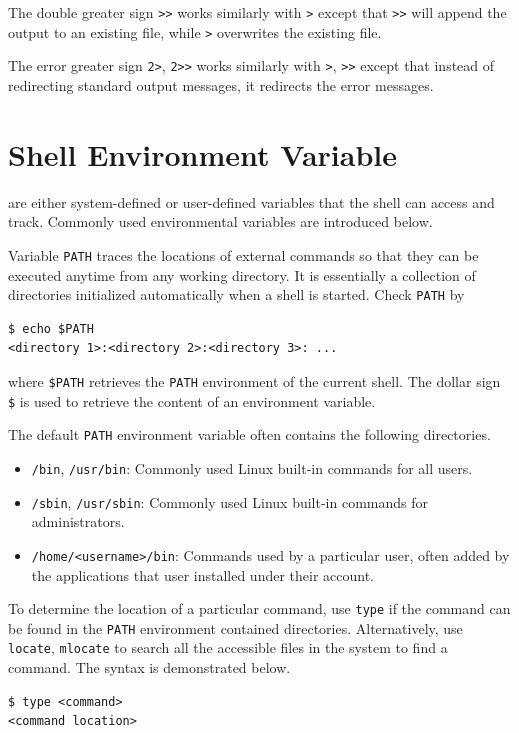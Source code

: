 The double greater sign \verb|>>| works similarly with \verb|>| except that \verb|>>| will append the output to an existing file, while \verb|>| overwrites the existing file.

The error greater sign \verb|2>|, \verb|2>>| works similarly with \verb|>|, \verb|>>| except that instead of redirecting standard output messages, it redirects the error messages.

\section{Shell Environment Variable}\label{ch:sb:subsec:shellenvvar}

 are either system-defined or user-defined variables that the shell can access and track. Commonly used environmental variables are introduced below.

Variable \verb|PATH| traces the locations of external commands so that they can be executed anytime from any working directory. It is essentially a collection of directories initialized automatically when a shell is started. Check \verb|PATH| by
\begin{lstlisting}
$ echo $PATH
<directory 1>:<directory 2>:<directory 3>: ...
\end{lstlisting}
where \verb|$PATH| retrieves the \verb|PATH| environment of the current shell. The dollar sign \verb|$| is used to retrieve the content of an environment variable. 

The default \verb|PATH| environment variable often contains the following directories. 
\begin{itemize}
\item \verb|/bin|, \verb|/usr/bin|: Commonly used Linux built-in commands for all users.
\item \verb|/sbin|, \verb|/usr/sbin|: Commonly used Linux built-in commands for administrators.
\item \verb|/home/<username>/bin|: Commands used by a particular user, often added by the applications that user installed under their account.
\end{itemize}
To determine the location of a particular command, use \verb|type| if the command can be found in the \verb|PATH| environment contained directories. Alternatively, use \verb|locate|, \verb|mlocate| to search all the accessible files in the system to find a command. The syntax is demonstrated below.
\begin{lstlisting}
$ type <command>
<command location>
\end{lstlisting}

